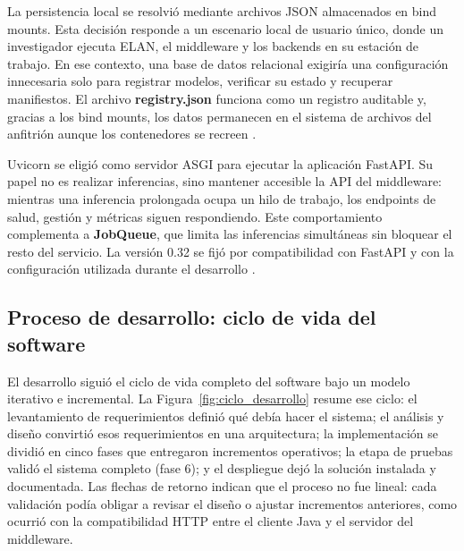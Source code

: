 \documentclass[11pt,a4paper]{article}
\begin{document}
La persistencia local se resolvió mediante archivos JSON almacenados en bind mounts. Esta decisión responde a un escenario local de usuario único, donde un investigador ejecuta ELAN, el middleware y los backends en su estación de trabajo. En ese contexto, una base de datos relacional exigiría una configuración innecesaria solo para registrar modelos, verificar su estado y recuperar manifiestos. El archivo \textbf{registry.json} funciona como un registro auditable y, gracias a los bind mounts, los datos permanecen en el sistema de archivos del anfitrión aunque los contenedores se recreen \cite{docker2026overview}.

Uvicorn se eligió como servidor ASGI para ejecutar la aplicación FastAPI. Su papel no es realizar inferencias, sino mantener accesible la API del middleware: mientras una inferencia prolongada ocupa un hilo de trabajo, los endpoints de salud, gestión y métricas siguen respondiendo. Este comportamiento complementa a \textbf{JobQueue}, que limita las inferencias simultáneas sin bloquear el resto del servicio. La versión 0.32 se fijó por compatibilidad con FastAPI y con la configuración utilizada durante el desarrollo \cite{uvicorn_docs}.
\vspace{1\baselineskip}

\subsection{Proceso de desarrollo: ciclo de vida del software}

El desarrollo siguió el ciclo de vida completo del software bajo un modelo iterativo e incremental. La Figura~\ref{fig:ciclo_desarrollo} resume ese ciclo: el levantamiento de requerimientos definió qué debía hacer el sistema; el análisis y diseño convirtió esos requerimientos en una arquitectura; la implementación se dividió en cinco fases que entregaron incrementos operativos; la etapa de pruebas validó el sistema completo (fase 6); y el despliegue dejó la solución instalada y documentada. Las flechas de retorno indican que el proceso no fue lineal: cada validación podía obligar a revisar el diseño o ajustar incrementos anteriores, como ocurrió con la compatibilidad HTTP entre el cliente Java y el servidor del middleware.
\end{document}
